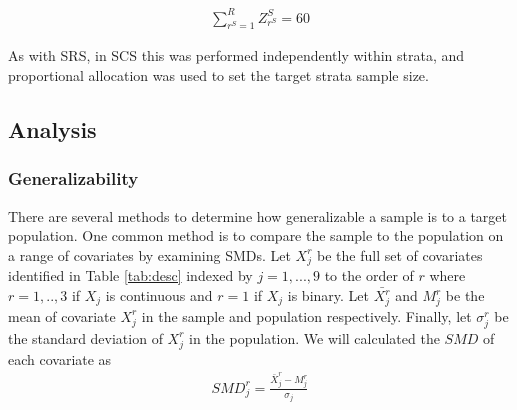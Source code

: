 \documentclass[man,floatsintext]{apa6}
\theoremstyle{definition}
\theoremstyle{definition}
\theoremstyle{definition}
\theoremstyle{remark}
\begin{document}
\begin{align} \label{eq:rankCS}
  \sum_{r^S=1}^R{Z^S_{r^S} = 60}
\end{align}

As with SRS, in SCS this was performed independently within strata, and
proportional allocation was used to set the target strata sample size.

\hypertarget{analysis}{%
\subsection{Analysis}\label{analysis}}

\hypertarget{generalizability}{%
\subsubsection{Generalizability}\label{generalizability}}

There are several methods to determine how generalizable a sample is to
a target population. One common method is to compare the sample to the
population on a range of covariates by examining SMDs. Let \(X^r_j\) be
the full set of covariates identified in Table \ref{tab:desc} indexed by
\(j = 1,...,9\) to the order of \(r\) where \(r = 1,..,3\) if \(X_j\) is
continuous and \(r = 1\) if \(X_j\) is binary. Let \(\bar{X^r_j}\) and
\(M^r_j\) be the mean of covariate \(X^r_j\) in the sample and
population respectively. Finally, let \(\sigma^r_j\) be the standard
deviation of \(X^r_j\) in the population. We will calculated the \(SMD\)
of each covariate as \begin{align}
  SMD^r_{j} = \frac{\bar{X}^{r}_{j}-M^{r}_{j}}{\sigma_{j}}
\end{align}
\end{document}
